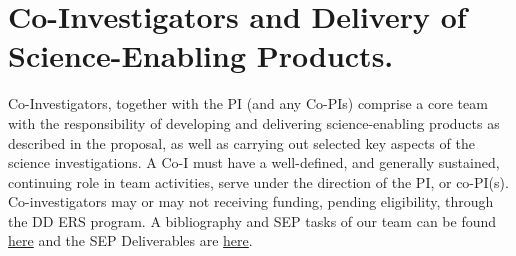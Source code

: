\section*{Co-Investigators and Delivery of Science-Enabling Products.}
Co-Investigators, together with the PI (and any Co-PIs) comprise a core team with the responsibility of developing and delivering science-enabling products as described in the proposal, as well as carrying out selected key aspects of the science investigations.  A Co-I must have a well-defined, and generally sustained, continuing role in team activities, serve under the direction of the PI, or co-PI(s). Co-investigators may or may not receiving funding, pending eligibility, through the DD ERS program. A bibliography and SEP tasks of our team can be found \href{https://github.com/d80b2t/JWST_ERS/blob/master/Proposal/CoI_bios.tex}{here} and the SEP Deliverables are \href{https://github.com/d80b2t/JWST_ERS/tree/master/Deliverables}{here}. 

%



